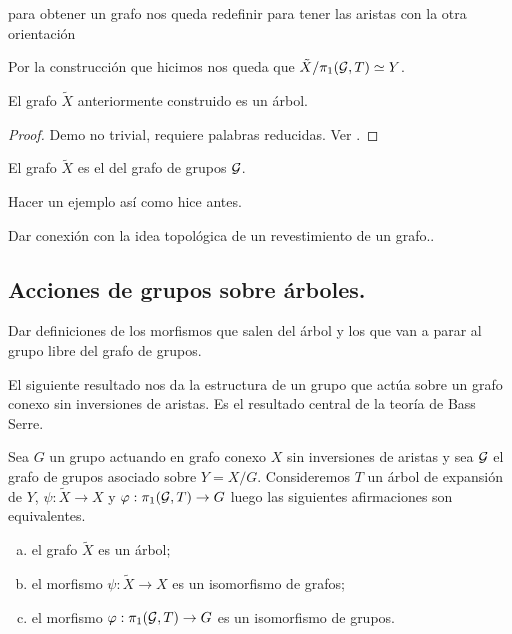 \documentclass[tesis.tex]{subfiles}
\newcommand{\cG}{ {\cal G} }
\newcommand{\Xm}{\widetilde X}
\begin{document}
para obtener un grafo nos queda redefinir para tener las aristas con la otra orientación

\medskip

Por la construcción que hicimos nos queda que $\tilde X / \pi_1(\cG, T) \simeq Y$.

\begin{teo}[Serre]
	El grafo $\tilde X$ anteriormente construido es un árbol.
\end{teo}
\begin{proof}
	Demo no trivial, requiere palabras reducidas.
	Ver \cite{serre2002trees}.
\end{proof}


\begin{deff}
	El grafo $\tilde X$ es el  del grafo de grupos $\cG$.
\end{deff}

\begin{ej}
	Hacer un ejemplo así como hice antes.
\end{ej}

Dar conexión con la idea topológica de un revestimiento de un grafo..

\subsection{Acciones de grupos sobre árboles.}

Dar definiciones de los morfismos que salen del árbol y los que van a parar al grupo libre del grafo de grupos.



El siguiente resultado nos da la estructura de un grupo que actúa sobre un grafo conexo sin inversiones de aristas. 
Es el resultado central de la teoría de Bass Serre.

\begin{teo}\label{teo_Serre}
	Sea $G$ un grupo actuando en grafo conexo $X$ sin inversiones de aristas y sea $\cal G$ el grafo de grupos asociado sobre $Y = X / G$.
	Consideremos $T$ un árbol de expansión de $Y$, $\psi: \Xm \to X$ y $\varphi: \pi_1({\cal G}, T) \to G$ luego las siguientes afirmaciones son equivalentes.
	\begin{enumerate}[(a)]
		\item el grafo $\Xm$ es un árbol;
		\item el morfismo $\psi: \Xm \to X$ es un isomorfismo de grafos;
		\item el morfismo $\varphi:\pi_1({\cal G}, T) \to G$ es un isomorfismo de grupos.
	\end{enumerate}
\end{teo}
\end{document}
